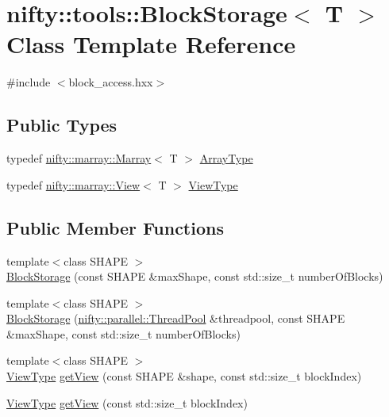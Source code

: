 \hypertarget{classnifty_1_1tools_1_1BlockStorage}{}\section{nifty\+:\+:tools\+:\+:Block\+Storage$<$ T $>$ Class Template Reference}
\label{classnifty_1_1tools_1_1BlockStorage}


{\ttfamily \#include $<$block\+\_\+access.\+hxx$>$}

\subsection*{Public Types}
\begin{DoxyCompactItemize}
\item 
typedef \hyperlink{classandres_1_1Marray}{nifty\+::marray\+::\+Marray}$<$ T $>$ \hyperlink{classnifty_1_1tools_1_1BlockStorage_af39a2936478b64389c56a5c6ef5aab7d}{Array\+Type}
\item 
typedef \hyperlink{classandres_1_1View}{nifty\+::marray\+::\+View}$<$ T $>$ \hyperlink{classnifty_1_1tools_1_1BlockStorage_afe259433c35f56d01be0b597a696e090}{View\+Type}
\end{DoxyCompactItemize}
\subsection*{Public Member Functions}
\begin{DoxyCompactItemize}
\item 
{\footnotesize template$<$class S\+H\+A\+PE $>$ }\\\hyperlink{classnifty_1_1tools_1_1BlockStorage_a95d95c49b1a1ed51c6d794d3fe8f2645}{Block\+Storage} (const S\+H\+A\+PE \&max\+Shape, const std\+::size\+\_\+t number\+Of\+Blocks)
\item 
{\footnotesize template$<$class S\+H\+A\+PE $>$ }\\\hyperlink{classnifty_1_1tools_1_1BlockStorage_a536abc42caab3d50becdfbadd2d58f89}{Block\+Storage} (\hyperlink{classnifty_1_1parallel_1_1ThreadPool}{nifty\+::parallel\+::\+Thread\+Pool} \&threadpool, const S\+H\+A\+PE \&max\+Shape, const std\+::size\+\_\+t number\+Of\+Blocks)
\item 
{\footnotesize template$<$class S\+H\+A\+PE $>$ }\\\hyperlink{classnifty_1_1tools_1_1BlockStorage_afe259433c35f56d01be0b597a696e090}{View\+Type} \hyperlink{classnifty_1_1tools_1_1BlockStorage_ae9f1e8b14c9281036350c8e6022c5ec0}{get\+View} (const S\+H\+A\+PE \&shape, const std\+::size\+\_\+t block\+Index)
\item 
\hyperlink{classnifty_1_1tools_1_1BlockStorage_afe259433c35f56d01be0b597a696e090}{View\+Type} \hyperlink{classnifty_1_1tools_1_1BlockStorage_a03263a4946397ebea215101c8e53bc24}{get\+View} (const std\+::size\+\_\+t block\+Index)
\end{DoxyCompactItemize}


